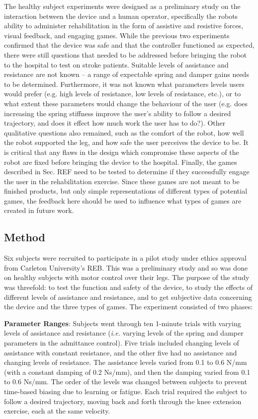 \documentclass[12pt]{report}
\begin{document}
	The healthy subject experiments were designed as a preliminary study on the interaction between the device and a human operator, specifically the robots ability to administer rehabilitation in the form of assistive and resistive forces, visual feedback, and engaging games. While the previous two experiments confirmed that the device was safe and that the controller functioned as expected, there were still questions that needed to be addressed before bringing the robot to the hospital to test on stroke patients. Suitable levels of assistance and resistance are not known -- a range of expectable spring and damper gains needs to be determined. Furthermore, it was not known what parameters levels users would prefer (e.g. high levels of resistance, low levels of resistance, etc.), or to what extent these parameters would change the behaviour of the user (e.g. does increasing the spring stiffness improve the user's ability to follow a desired trajectory, and does it effect how much work the user has to do?). Other qualitative questions also remained, such as the comfort of the robot, how well the robot supported the leg, and how safe the user perceives the device to be. It is critical that any flaws in the design which compromise these aspects of the robot are fixed before bringing the device to the hospital. Finally, the games described in Sec. REF need to be tested to determine if they successfully engage the user in the rehabilitation exercise. Since these games are not meant to be finished products, but only simple representations of different types of potential games, the feedback here should be used to influence what types of games are created in future work.  
	
		\subsection{Method}
		
		Six subjects were recruited to participate in a pilot study under ethics approval from Carleton University's REB. This was a preliminary study and so was done on healthy subjects with motor control over their legs. The purpose of the study was threefold: to test the function and safety of the device, to study the effects of different levels of assistance and resistance, and to get subjective data concerning the device and the three types of games. The experiment consisted of two phases: 

\textbf{Parameter Ranges}: Subjects went through ten 1-minute trials with varying levels of assistance and resistance (\textit{i.e.} varying levels of the spring and damper parameters in the admittance control). Five trials included changing levels of assistance with constant resistance, and the other five had no assistance and changing levels of resistance. The assistance levels varied from 0.1 to 0.6 N/mm (with a constant damping of 0.2 Ns/mm), and then the damping varied from 0.1 to 0.6 Ns/mm. The order of the levels was changed between subjects to prevent time-based biasing due to learning or fatigue. Each trial required the subject to follow a desired trajectory, moving back and forth through the knee extension exercise, each at the same velocity. 
\end{document}
